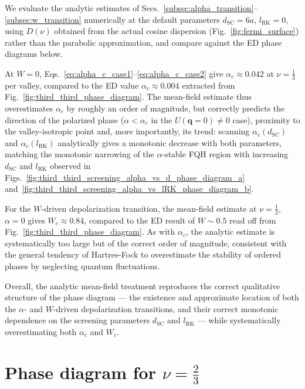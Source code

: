 We evaluate the analytic estimates of Secs.~\ref{subsec:alpha_transition}--\ref{subsec:w_transition} numerically at the default parameters $d_{\text{SC}}=6a$, $l_{\text{RK}}=0$, using $D(\nu)$ obtained from the actual cosine dispersion (Fig.~\ref{fig:fermi_surface}) rather than the parabolic approximation, and compare against the ED phase diagrams below.

At $W=0$, Eqs.~\eqref{eq:alpha_c_case1}--\eqref{eq:alpha_c_case2} give $\alpha_c \approx 0.042$ at $\nu=\frac13$ per valley, compared to the ED value $\alpha_c \approx 0.004$ extracted from Fig.~\ref{fig:third_third_phase_diagram}. The mean-field estimate thus overestimates $\alpha_c$ by roughly an order of magnitude, but correctly predicts the direction of the polarized phase ($\alpha < \alpha_c$ in the $U(\mathbf{q}=0)\neq 0$ case), proximity to the valley-isotropic point and, more importantly, its trend: scanning $\alpha_c(d_{\text{SC}})$ and $\alpha_c(l_{\text{RK}})$ analytically gives a monotonic decrease with both parameters, matching the monotonic narrowing of the $\alpha$-stable FQH region with increasing $d_{\text{SC}}$ and $l_{\text{RK}}$ observed in Figs.~\ref{fig:third_third_screening_alpha_vs_d_phase_diagram_a} and~\ref{fig:third_third_screening_alpha_vs_lRK_phase_diagram_b}.


For the $W$-driven depolarization transition, the mean-field estimate at $\nu = \tfrac13$, $\alpha = 0$ gives $W_c \approx 0.84$, compared to the ED result of $W \sim 0.5$ read off from Fig.~\ref{fig:third_third_phase_diagram}. As with $\alpha_c$, the analytic estimate is systematically too large but of the correct order of magnitude, consistent with the general tendency of Hartree-Fock to overestimate the stability of ordered phases by neglecting quantum fluctuations.


Overall, the analytic mean-field treatment reproduces the correct qualitative structure of the phase diagram --- the existence and approximate location of both the $\alpha$- and $W$-driven depolarization transitions, and their correct monotonic dependence on the screening parameters $d_{\text{SC}}$ and $l_{\text{RK}}$ --- while systematically overestimating both $\alpha_c$ and $W_c$.

\section{\texorpdfstring{Phase diagram for $\nu = \frac{2}{3}$}{Phase diagram for nu = 2/3}}\label{sec:third_third_results}

